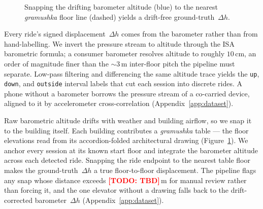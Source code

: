 \documentclass[manuscript,review,screen]{acmart}
\newcommand{\todo}[1]{\textcolor{red}{\textbf{[TODO: #1]}}}
\begin{document}
\begin{figure}
  \vspace{-0.7em}
  \centering
  \caption{Snapping the drifting barometer altitude (blue) to the
    nearest \emph{gramushka} floor line (dashed) yields a drift-free
    ground-truth~$\Delta h$.}
  \label{fig:gt-snap}
  \vspace{-0.6em}
\end{figure}

Every ride's signed displacement~$\Delta h$ comes from the barometer
rather than from hand-labelling.  We invert the pressure stream to
altitude through the ISA barometric formula; a consumer barometer
resolves altitude to roughly $10$\,cm, an order of magnitude finer
than the $\sim\!3$\,m inter-floor pitch the pipeline must separate.
Low-pass filtering and differencing the same altitude trace yields
the \texttt{up}, \texttt{down}, and \texttt{outside} interval labels
that cut each session into discrete rides.  A phone without a
barometer borrows the pressure stream of a co-carried device,
aligned to it by accelerometer cross-correlation
(Appendix~\ref{app:dataset}).

Raw barometric altitude drifts with weather and building airflow, so
we snap it to the building itself.  Each building contributes a
\emph{gramushka} table --- the floor elevations read from its
accordion-folded architectural drawing (Figure~\ref{fig:gt-snap}).
We anchor every session at its known start floor and integrate the
barometer altitude across each detected ride.  Snapping the ride
endpoint to the nearest table floor makes the ground-truth~$\Delta h$
a true floor-to-floor displacement.  The pipeline flags any snap
whose distance exceeds \todo{TBD}\,m for manual review rather than
forcing it, and the one elevator without a drawing falls back to the
drift-corrected barometer~$\Delta h$ (Appendix~\ref{app:dataset}).
\end{document}
